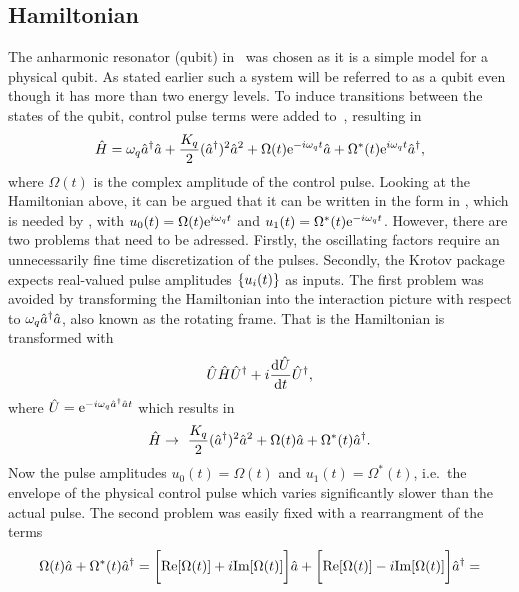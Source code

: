 \documentclass[main.tex]{subfiles}
\begin{document}
\subsection{Hamiltonian}
The anharmonic resonator (qubit) in~ was chosen as it is a simple model for a physical qubit.
As stated earlier such a system will be referred to as a qubit even though it has more than two energy levels.
To induce transitions between the states of the qubit, control pulse terms were added to~, resulting in
\begin{equation}
    \hat{H} = \omega_{q} \hat{a}^\dagger\hat{a} + \frac{K_q}{2} (\hat{a}^\dagger)^2\hat{a}^2 + \Omega(t)\mathrm{e}^{-i\omega_{q}t}\hat{a} + \Omega^*(t)\mathrm{e}^{i\omega_{q}t}\hat{a}^\dagger,
    \label{eq:system-hamiltonian}
\end{equation}
where \( \Omega(t) \) is the complex amplitude of the control pulse.
Looking at the Hamiltonian above, it can be argued that it can be written in the form in , which is needed by \krotov{}, with \( u_0(t) = \Omega(t)\mathrm{e}^{i\omega_{q}t} \) and \( u_1(t) = \Omega^*(t)\mathrm{e}^{-i\omega_{q}t} \).
However, there are two problems that need to be adressed.
Firstly, the oscillating factors require an unnecessarily fine time discretization of the pulses.
Secondly, the Krotov package expects real-valued pulse amplitudes \( \qty{u_i(t)} \) as inputs.
The first problem was avoided by transforming the Hamiltonian into the interaction picture with respect to \(\omega_{q} \hat{a}^\dagger\hat{a} \), also known as the rotating frame.
That is the Hamiltonian is transformed with
\begin{equation}
    \hat{U}\hat{H}\hat{U}^\dagger + i\dv{\hat{U}}{t}\hat{U}^\dagger,
\end{equation}
where \( \hat{U} = \mathrm{e}^{-i\omega_{q} \hat{a}^\dagger\hat{a} t} \) which results in
\begin{equation}
    \hat{H} \rightarrow~ \frac{K_q}{2}(\hat{a}^\dagger)^2\hat{a}^2 + \Omega(t)\hat{a} + \Omega^*(t)\hat{a}^\dagger.
    \label{eq:krotov-hamiltonian-rotating}
\end{equation}
Now the pulse amplitudes \( u_0(t) = \Omega(t) \) and \( u_1(t) = \Omega^*(t) \), i.e.\ the envelope of the physical control pulse which varies significantly slower than the actual pulse.
The second problem was easily fixed with a rearrangment of the terms
\[ \Omega(t)\hat{a} + \Omega^*(t)\hat{a}^\dagger = \bigg[\text{Re}\qty[\Omega(t)]+i\text{Im}\qty[\Omega(t)]\bigg]\hat{a} + \bigg[\text{Re}\qty[\Omega(t)]-i\text{Im}\qty[\Omega(t)]\bigg]\hat{a}^\dagger = \]
\end{document}

